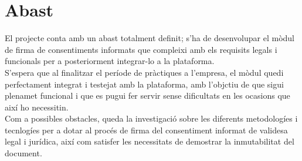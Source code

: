 \section{Abast}

El projecte conta amb un abast totalment definit; s'ha de desenvolupar el mòdul de firma de consentiments informats que compleixi amb els requisits legals i funcionals per a posteriorment integrar-lo a la plataforma.\\
\newline S'espera que al finalitzar el període de pràctiques a l'empresa, el mòdul quedi perfectament integrat i testejat amb la plataforma, amb l'objctiu de que sigui plenamet funcional i que es pugui fer servir sense dificultats en les ocasions que així ho necessitin.\\
\newline Com a possibles obstacles, queda la investigació sobre les diferents metodologíes i tecnlogíes per a dotar al procés de firma del consentiment informat de validesa legal i jurídica, així com satisfer les necessitats de demostrar la inmutabilitat del document.